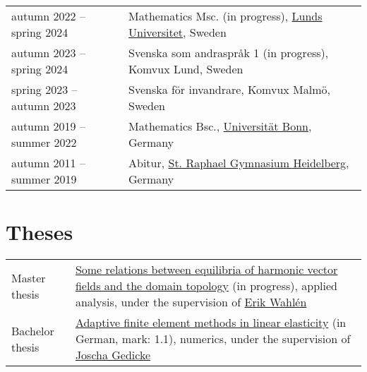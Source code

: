 \documentclass[11pt, letterpaper]{article}
\begin{document}
\begin{tabularx}{\textwidth}{>{\raggedright\arraybackslash}p{45mm} >{\raggedright\arraybackslash}X}
  autumn 2022\linebreak\hspace*{1em} -- spring 2024 & Mathematics Msc. (in progress), \href{https://maths.lu.se/}{Lunds Universitet}, Sweden \\[0.5ex]
  autumn 2023\linebreak\hspace*{1em} -- spring 2024 & Svenska som andraspråk 1 (in progress), Komvux Lund, Sweden \\[0.5ex]
  spring 2023\linebreak\hspace*{1em} -- autumn 2023 & Svenska för invandrare, Komvux Malmö, Sweden \\[0.5ex]
  autumn 2019\linebreak\hspace*{1em} -- summer 2022 & Mathematics Bsc., \href{http://www.math.uni-bonn.de/}{Universität Bonn}, Germany \\[0.5ex]
  autumn 2011\linebreak\hspace*{1em} -- summer 2019 & Abitur, \href{https://www.srgh.de/}{St. Raphael Gymnasium Heidelberg}, Germany
\end{tabularx}

\section{Theses}
\begin{tabularx}{\textwidth}{p{45mm} >{\raggedright\arraybackslash}X}
  Master thesis & \href{https://github.com/TheoKoppenhoefer/master-thesis/blob/main/Text/Thesis_TheoKoppenhoefer.pdf}{Some relations between equilibria of harmonic vector fields and the domain topology} (in progress),
  applied analysis, under the supervision of \href{https://www.maths.lu.se/english/research/staff/erik-wahlen/}{Erik Wahlén} \\
  Bachelor thesis & \href{https://github.com/TheoKoppenhoefer/bachelorarbeit/blob/main/Text/Bachelorarbeit_Hauptteil.pdf}{Adaptive finite element methods in linear elasticity} (in German,  \linebreak mark: 1.1),
  numerics, under the supervision of \href{https://ins.uni-bonn.de/staff/gedicke}{Joscha Gedicke}
\end{tabularx}
\end{document}
